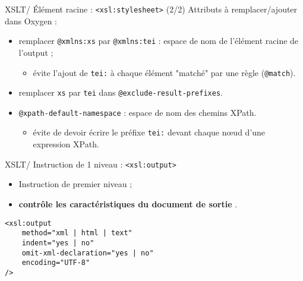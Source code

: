 \documentclass{beamer}
\begin{document}
    \begin{frame}{XSLT/ Élément racine : \texttt{<xsl:stylesheet>} (2/2)}
    \Large Attributs à remplacer/ajouter dans Oxygen :
        \begin{itemize}
            \item remplacer \texttt{@xmlns:xs} par \texttt{@xmlns:tei} : espace de nom de l'élément racine de l'output ;
            \begin{itemize}
            \large
                \item évite l'ajout de \texttt{tei:} à chaque élément "matché" par une règle (\texttt{@match}).
            \end{itemize}
            \bigskip
            \item remplacer \texttt{xs} par \texttt{tei} dans \texttt{@exclude-result-prefixes}.
            \bigskip
            \item \texttt{@xpath-default-namespace} :  espace de nom des chemins XPath.
            \begin{itemize}
            \large
                \item évite de devoir écrire le préfixe \texttt{tei:} devant chaque n\oe ud d'une expression XPath.
            \end{itemize}
        \end{itemize}
    \end{frame}

    \begin{frame}[fragile]{XSLT/ Instruction de 1 niveau : \texttt{<xsl:output>}}
    \Large
        \begin{itemize}
            \item Instruction de premier niveau ;
            \item \og \textbf{contrôle les caractéristiques du document de sortie} \fg.
        \end{itemize}

        \begin{verbatim}
<xsl:output
    method="xml | html | text"
    indent="yes | no"
    omit-xml-declaration="yes | no"
    encoding="UTF-8"
/>
        \end{verbatim}
    \end{frame}
\end{document}

